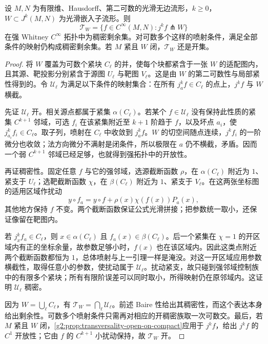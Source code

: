 \begin{theorem}\label{g2:thm:jet-transversality}
	设 \(M,N\) 为有限维、Hausdorff、第二可数的光滑无边流形，\(k\geq0\)，\(W\subset J^k(M,N)\) 为光滑嵌入子流形。则
	\[
		\mathcal T_W=\{f\in C^\infty(M,N):j^k f\pitchfork W\}
	\]
	在强 Whitney \(C^\infty\) 拓扑中为稠密剩余集。对可数多个这样的喷射条件，满足全部条件的映射仍构成稠密剩余集。若 \(M\) 紧且 \(W\) 闭，\(\mathcal T_W\) 还是开集。
\end{theorem}
\begin{proof}
	将 \(W\) 覆盖为可数个紧块 \(C_\ell\) 的并，使每个块都紧含于一张 \(W\) 的适配图内，且其源、靶投影分别紧含于源图 \(U_\ell\) 与靶图 \(V_\ell\)。这是由 \(W\) 的第二可数性与局部紧性得到的。令 \(\mathcal U_\ell\) 为满足以下条件的映射集合：在所有 \(j_a^kf\in C_\ell\) 的点上，\(j^kf\) 与 \(W\) 横截。

	先证 \(\mathcal U_\ell\) 开。相关源点都属于紧集 \(\alpha(C_\ell)\)。若某个 \(f\in\mathcal U_\ell\) 没有保持此性质的紧集 \(C^{k+1}\) 邻域，可选 \(f_i\) 在该紧集附近至 \(k+1\) 阶趋于 \(f\)，以及坏点 \(a_i\)，使 \(j_{a_i}^kf_i\in C_\ell\)。取子列，喷射在 \(C_\ell\) 中收敛到 \(j_a^kf\)。\(W\) 的切空间随点连续，\(j^kf_i\) 的一阶微分也收敛；法方向微分不满射是闭条件，所以极限在 \(a\) 仍不横截，矛盾。因而一个弱 \(C^{k+1}\) 邻域已经足够，也就得到强拓扑中的开放性。

	再证稠密性。固定任意 \(f\) 与它的强邻域，选源截断函数 \(\rho\)，在 \(\alpha(C_\ell)\) 附近为 \(1\)、紧支于 \(U_\ell\)；选靶截断函数 \(\chi\)，在 \(\beta(C_\ell)\) 附近为 \(1\)、紧支于 \(V_\ell\)。在这两张坐标图的适用区域作扰动
	\[
		y\circ f_a=y\circ f+\rho(x)\chi(f(x))P_a(x),
	\]
	其他地方保持 \(f\) 不变。两个截断函数保证公式光滑拼接；把参数统一取小，还保证像留在靶图内。

	若 \(j_x^kf_a\in C_\ell\)，则 \(x\in\alpha(C_\ell)\) 且 \(f_a(x)\in\beta(C_\ell)\)。后一个紧集在 \(\chi=1\) 的开区域内有正的坐标余量，故参数足够小时，\(f(x)\) 也在该区域内。因此这类点附近两个截断函数都恒为 \(1\)，总体喷射与上一引理一样是淹没。对这一开区域应用参数横截性，取得任意小的参数，使扰动属于 \(\mathcal U_\ell\)。扰动紧支，故只碰到强邻域控制族中的有限多个紧块；所有有限阶误差可以同时取小，所得映射仍在原邻域内。这证明 \(\mathcal U_\ell\) 稠密。

	因为 \(W=\bigcup_\ell C_\ell\)，有 \(\mathcal T_W=\bigcap_\ell\mathcal U_\ell\)。前述 Baire 性给出其稠密性，而这个表达本身给出剩余性。可数多个喷射条件只需再对相应的开稠密族取一次可数交。最后，若 \(M\) 紧且 \(W\) 闭，\cref{g2:prop:transversality-open-on-compact}应用于 \(j^kf\)，给出 \(j^kf\) 的 \(C^1\) 开放性；它由 \(f\) 的 \(C^{k+1}\) 小扰动保持，故 \(\mathcal T_W\) 开。
\end{proof}

